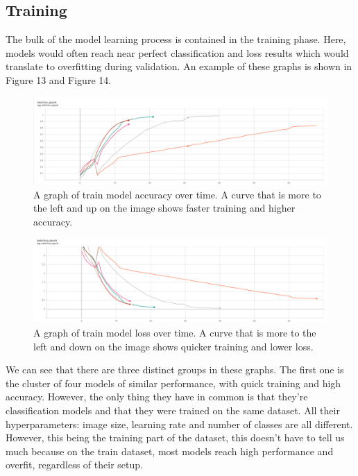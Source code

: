 \documentclass[]{article}
\begin{document}
\hypertarget{training-2}{%
\subsection{Training}\label{training-2}}

The bulk of the model learning process is contained in the training
phase. Here, models would often reach near perfect classification and
loss results which would translate to overfitting during validation. An
example of these graphs is shown in Figure 13 and Figure 14.

\begin{figure}
\centering
\includegraphics[width=1\textwidth,height=\textheight]{./tex2pdf.-3ffa51a14b505aec/fa577107b1543a7a38251b281e05210833ed5b02.png}
\caption{A graph of train model accuracy over time. A curve that is more
to the left and up on the image shows faster training and higher
accuracy.}
\end{figure}

\begin{figure}
\centering
\includegraphics[width=1\textwidth,height=\textheight]{./tex2pdf.-3ffa51a14b505aec/8a67595a61b01767afa3ab020c7dfc41e7a94ba8.png}
\caption{A graph of train model loss over time. A curve that is more to
the left and down on the image shows quicker training and lower loss.}
\end{figure}

We can see that there are three distinct groups in these graphs. The
first one is the cluster of four models of similar performance, with
quick training and high accuracy. However, the only thing they have in
common is that they're classification models and that they were trained
on the same dataset. All their hyperparameters: image size, learning
rate and number of classes are all different. However, this being the
training part of the dataset, this doesn't have to tell us much because
on the train dataset, most models reach high performance and overfit,
regardless of their setup.
\end{document}

